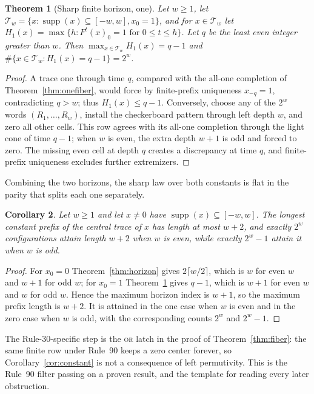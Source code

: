 \documentclass[11pt]{article}
\newtheorem{theorem}{Theorem}[section]
\newtheorem{corollary}[theorem]{Corollary}
\theoremstyle{definition}
\newcommand{\supp}{\operatorname{supp}}
\begin{document}
\begin{theorem}[Sharp finite horizon, one]\label{thm:onehorizon}
Let $w\ge1$, let $\mathcal T_w=\{x:\supp(x)\subseteq[-w,w],x_0=1\}$, and for
$x\in\mathcal T_w$ let $H_1(x)=\max\{h:F^t(x)_0=1\text{ for }0\le t\le h\}$. Let
$q$ be the least even integer greater than $w$. Then
$\max_{x\in\mathcal T_w}H_1(x)=q-1$ and
$\#\{x\in\mathcal T_w:H_1(x)=q-1\}=2^w$.
\end{theorem}
\begin{proof}
A trace one through time $q$, compared with the all-one completion of
Theorem~\ref{thm:onefiber}, would force by finite-prefix uniqueness
$x_{-q}=1$, contradicting $q>w$; thus $H_1(x)\le q-1$. Conversely, choose any of
the $2^w$ words $(R_1,\dots,R_w)$, install the checkerboard pattern through
left depth $w$, and zero all other cells. This row agrees with its all-one
completion through the light cone of time $q-1$; when $w$ is even, the extra
depth $w+1$ is odd and forced to zero. The missing even cell at depth $q$
creates a discrepancy at time $q$, and finite-prefix uniqueness excludes
further extremizers.
\end{proof}

Combining the two horizons, the sharp law over both constants is flat in the
parity that splits each one separately.

\begin{corollary}\label{cor:bothhorizon}
Let $w\ge1$ and let $x\ne0$ have $\supp(x)\subseteq[-w,w]$. The longest
constant prefix of the central trace of $x$ has length at most $w+2$, and
exactly $2^w$ configurations attain length $w+2$ when $w$ is even, while
exactly $2^w-1$ attain it when $w$ is odd.
\end{corollary}
\begin{proof}
For $x_0=0$ Theorem~\ref{thm:horizon} gives $2\lceil w/2\rceil$, which is $w$
for even $w$ and $w+1$ for odd $w$; for $x_0=1$ Theorem~\ref{thm:onehorizon}
gives $q-1$, which is $w+1$ for even $w$ and $w$ for odd $w$. Hence the maximum
horizon index is $w+1$, so the maximum prefix length is $w+2$. It is attained
in the one case when $w$ is even and in the zero case when $w$ is odd, with the
corresponding counts $2^w$ and $2^w-1$.
\end{proof}

The Rule-30-specific step is the \textsc{or} latch in the proof of
Theorem~\ref{thm:fiber}: the same finite row under Rule~90 keeps a zero center
forever, so Corollary~\ref{cor:constant} is not a consequence of left
permutivity. This is the Rule~90 filter passing on a proven result, and the
template for reading every later obstruction.
\end{document}
